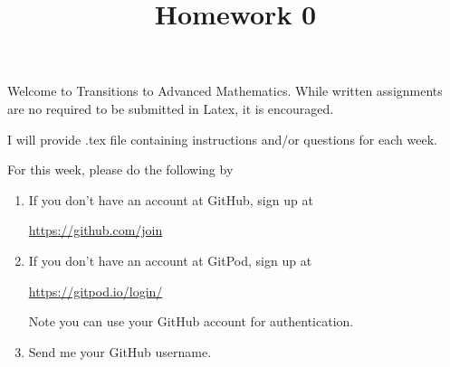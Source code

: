 \documentclass[12pt]{amsart}
\theoremstyle{definition}
\begin{document}
\title{Homework 0}

\maketitle

Welcome to Transitions to Advanced Mathematics. While written assignments are no required to be 
submitted in Latex, it is encouraged. 

I will provide .tex file containing instructions and/or questions for each week. 

For this week, please do the following by

\begin{enumerate}
	\item If you don't have an account at GitHub, sign up at 
		\begin{center}
			\href{https://github.com/join}{https://github.com/join}
		\end{center}
		
	\item If you don't have an account at GitPod, sign up at 
		\begin{center}
			\href{https://gitpod.io/login/}{https://gitpod.io/login/}
		\end{center}
	Note you can use your GitHub account for authentication. 
			
	\item Send me your GitHub username. 
\end{enumerate}
\end{document}
